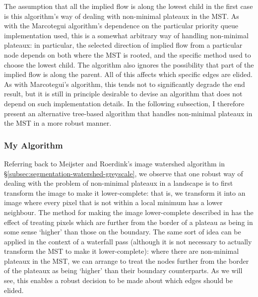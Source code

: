 The assumption that all the implied flow is along the lowest child in the first case is this algorithm's way of dealing with non-minimal plateaux in the MST. As with the Marcotegui algorithm's dependence on the particular priority queue implementation used, this is a somewhat arbitrary way of handling non-minimal plateaux: in particular, the selected direction of implied flow from a particular node depends on both where the MST is rooted, and the specific method used to choose the lowest child. The algorithm also ignores the possibility that part of the implied flow is along the parent. All of this affects which specific edges are elided. As with Marcotegui's algorithm, this tends not to significantly degrade the end result, but it is still in principle desirable to devise an algorithm that does not depend on such implementation details. In the following subsection, I therefore present an alternative tree-based algorithm that handles non-minimal plateaux in the MST in a more robust manner.


\subsubsection{My Algorithm}
\label{subsubsec:segmentation-waterfall-myalgorithm}


Referring back to Meijster and Roerdink's image watershed algorithm in \S\ref{subsec:segmentation-watershed-greyscale}, we observe that one robust way of dealing with the problem of non-minimal plateaux in a landscape is to first transform the image to make it lower-complete: that is, we transform it into an image where every pixel that is not within a local minimum has a lower neighbour. The method for making the image lower-complete described in \cite{meijster98} has the effect of treating pixels which are further from the border of a plateau as being in some sense `higher' than those on the boundary. The same sort of idea can be applied in the context of a waterfall pass (although it is not necessary to actually transform the MST to make it lower-complete): where there are non-minimal plateaux in the MST, we can arrange to treat the nodes further from the border of the plateaux as being `higher' than their boundary counterparts. As we will see, this enables a robust decision to be made about which edges should be elided.

